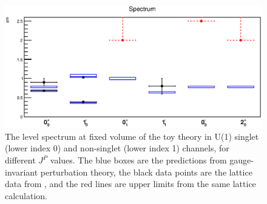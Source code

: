 \documentclass[final,twoside,12pt]{article}
\newcommand*{\1}{1\!\!\!\bot}
\begin{document}
\begin{figure}
\includegraphics[width=\linewidth]{spec-su3}
\caption{\label{fig:gutspec}The level spectrum at fixed volume of the toy theory in U(1) singlet (lower index 0) and non-singlet (lower index 1) channels, for different $J^P$ values. The blue boxes are the predictions from gauge-invariant perturbation theory, the black data points are the lattice data from \cite{Maas:unpublishedtoerek}, and the red lines are upper limits from the same lattice calculation.}
\end{figure}
\end{document}
